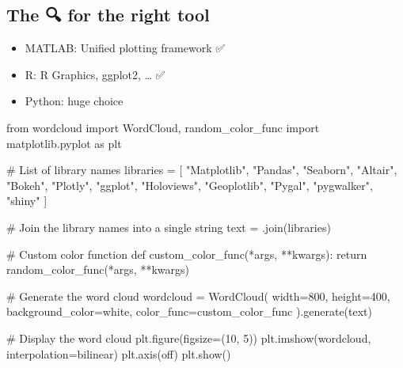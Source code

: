 \documentclass[
  letterpaper,
  DIV=11,
  numbers=noendperiod]{scrartcl}
\newenvironment{Shaded}{\begin{snugshade}}{\end{snugshade}}
\newcommand{\CommentTok}[1]{\textcolor[rgb]{0.37,0.37,0.37}{#1}}
\newcommand{\ControlFlowTok}[1]{\textcolor[rgb]{0.00,0.23,0.31}{#1}}
\newcommand{\DecValTok}[1]{\textcolor[rgb]{0.68,0.00,0.00}{#1}}
\newcommand{\ImportTok}[1]{\textcolor[rgb]{0.00,0.46,0.62}{#1}}
\newcommand{\KeywordTok}[1]{\textcolor[rgb]{0.00,0.23,0.31}{#1}}
\newcommand{\NormalTok}[1]{\textcolor[rgb]{0.00,0.23,0.31}{#1}}
\newcommand{\OperatorTok}[1]{\textcolor[rgb]{0.37,0.37,0.37}{#1}}
\newcommand{\StringTok}[1]{\textcolor[rgb]{0.13,0.47,0.30}{#1}}
\providecommand{\tightlist}{%
  \setlength{\itemsep}{0pt}\setlength{\parskip}{0pt}}\usepackage{longtable,booktabs,array}
\begin{document}
\hypertarget{the-for-the-right-tool}{%
\subsection{The 🔍 for the right tool}\label{the-for-the-right-tool}}

\begin{itemize}
\tightlist
\item
  MATLAB: Unified plotting framework ✅
\item
  R: R Graphics, ggplot2, \ldots{} ✅
\item
  Python: huge choice 🤯
\end{itemize}

\begin{Shaded}
\begin{Highlighting}[]
\ImportTok{from}\NormalTok{ wordcloud }\ImportTok{import}\NormalTok{ WordCloud, random\_color\_func}
\ImportTok{import}\NormalTok{ matplotlib.pyplot }\ImportTok{as}\NormalTok{ plt}

\CommentTok{\# List of library names}
\NormalTok{libraries }\OperatorTok{=}\NormalTok{ [}
    \StringTok{"Matplotlib"}\NormalTok{, }\StringTok{"Pandas"}\NormalTok{, }\StringTok{"Seaborn"}\NormalTok{, }\StringTok{"Altair"}\NormalTok{, }\StringTok{"Bokeh"}\NormalTok{, }\StringTok{"Plotly"}\NormalTok{,}
    \StringTok{"ggplot"}\NormalTok{, }\StringTok{"Holoviews"}\NormalTok{, }\StringTok{"Geoplotlib"}\NormalTok{, }\StringTok{"Pygal"}\NormalTok{, }\StringTok{"pygwalker"}\NormalTok{, }\StringTok{"shiny"}
\NormalTok{]}

\CommentTok{\# Join the library names into a single string}
\NormalTok{text }\OperatorTok{=} \StringTok{\textquotesingle{} \textquotesingle{}}\NormalTok{.join(libraries)}

\CommentTok{\# Custom color function}
\KeywordTok{def}\NormalTok{ custom\_color\_func(}\OperatorTok{*}\NormalTok{args, }\OperatorTok{**}\NormalTok{kwargs):}
    \ControlFlowTok{return}\NormalTok{ random\_color\_func(}\OperatorTok{*}\NormalTok{args, }\OperatorTok{**}\NormalTok{kwargs)}

\CommentTok{\# Generate the word cloud}
\NormalTok{wordcloud }\OperatorTok{=}\NormalTok{ WordCloud(}
\NormalTok{    width}\OperatorTok{=}\DecValTok{800}\NormalTok{, height}\OperatorTok{=}\DecValTok{400}\NormalTok{, background\_color}\OperatorTok{=}\StringTok{\textquotesingle{}white\textquotesingle{}}\NormalTok{, color\_func}\OperatorTok{=}\NormalTok{custom\_color\_func}
\NormalTok{).generate(text)}

\CommentTok{\# Display the word cloud}
\NormalTok{plt.figure(figsize}\OperatorTok{=}\NormalTok{(}\DecValTok{10}\NormalTok{, }\DecValTok{5}\NormalTok{))}
\NormalTok{plt.imshow(wordcloud, interpolation}\OperatorTok{=}\StringTok{\textquotesingle{}bilinear\textquotesingle{}}\NormalTok{)}
\NormalTok{plt.axis(}\StringTok{\textquotesingle{}off\textquotesingle{}}\NormalTok{)}
\NormalTok{plt.show()}
\end{Highlighting}
\end{Shaded}
\end{document}
